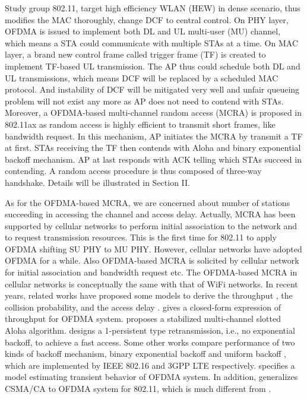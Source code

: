 \documentclass[journal]{IEEEtran}
\begin{document}
Study group 802.11, target high efficiency WLAN (HEW) in dense scenario, thus modifies the MAC thoroughly, change DCF to central control. 
On PHY layer, OFDMA is issued to implement both DL and UL multi-user (MU) channel, which means a STA could communicate with multiple STAs at a time. 
On MAC layer, a brand new control frame called trigger frame (TF) is created to implement TF-based UL transmission. 
The AP thus could schedule both DL and UL transmissions, which means DCF will be replaced by a scheduled MAC protocol. 
And instability of DCF will be mitigated very well and unfair queueing problem will not exist any more as AP does not need to contend with STAs.
Moreover, a OFDMA-based multi-channel random access (MCRA) is proposed in 802.11ax as random access is highly efficient to transmit short frames, like bandwidth request. 
In this mechanism, AP initiates the MCRA by transmit a TF at first. 
STAs receiving the TF then contends with Aloha and binary exponential backoff mechanism. 
AP at last responds with ACK telling which STAs succeed in contending.
A random access procedure is thus composed of three-way handshake. 
Details will be illustrated in Section II.

As for the OFDMA-based MCRA, we are concerned about number of stations succeeding in accessing the channel and access delay.
Actually, MCRA has been supported by cellular networks to perform initial association to the network and to request transmission resources.
This is the first time for 802.11 to apply OFDMA shifting SU PHY to MU PHY.
However, cellular networks have adopted OFDMA for a while. 
Also OFDMA-based MCRA is solicited by cellular network for initial association and bandwidth request etc.
The OFDMA-based MCRA in cellular networks is conceptually the same with that of WiFi networks. 
In recent years, related works have proposed some models to derive the throughput \cite{zhou2008efficient}\cite{shen2003performance}\cite{choi2006multichannel}, the collision probability\cite{kim2012performance}\cite{seo2011design}, and the access delay \cite{zhou2008efficient}\cite{kim2012performance}\cite{seo2011design}\cite{behroozi1992delay}. 
\cite{zhou2008efficient} gives a closed-form expression of throughput for OFDMA system. 
\cite{shen2003performance} proposes a stabilized multi-channel slotted Aloha algorithm.
\cite{choi2006multichannel} designs a 1-persistent type retransmission, i.e., no exponential backoff, to achieve a fast access.
Some other works compare performance of two kinds of backoff mechanism, binary exponential backoff and uniform backoff  \cite{zhou2008efficient}\cite{seo2011design}\cite{kim2012performance}, which are implemented by IEEE 802.16 and 3GPP LTE respectively.  
\cite{wei2015modeling} specifies a model estimating transient behavior of OFDMA system.
In addition, \cite{GeneralizedOFDMACSMACA} generalizes CSMA/CA to OFDMA system for 802.11, which is much different from \cite{draft_ax}.
\end{document}
